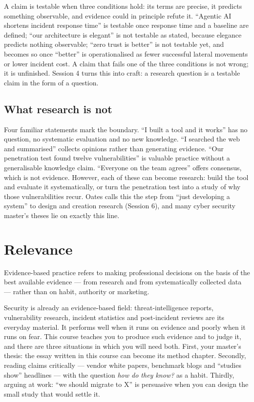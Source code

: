 \documentclass[11pt,a4paper,british,twoside=false,headings=small,chapterprefix=false,numbers=noenddot]{scrbook}
\newenvironment{block}[1]{\begin{tcolorbox}[scriptbox, title={#1}]}{\end{tcolorbox}}
\begin{document}
A claim is testable when three conditions hold: its terms are precise, it predicts something observable, and evidence could in principle refute it. ``Agentic AI shortens incident response time'' is testable once response time and a baseline are defined; ``our architecture is elegant'' is not testable as stated, because elegance predicts nothing observable; ``zero trust is better'' is not testable yet, and becomes so once ``better'' is operationalised as fewer successful lateral movements or lower incident cost. A claim that fails one of the three conditions is not wrong; it is unfinished. Session 4 turns this into craft: a research question is a testable claim in the form of a question.

\subsection{What research is not}

Four familiar statements mark the boundary. ``I built a tool and it works'' has no question, no systematic evaluation and no new knowledge. ``I searched the web and summarised'' collects opinions rather than generating evidence. ``Our penetration test found twelve vulnerabilities'' is valuable practice without a generalisable knowledge claim. ``Everyone on the team agrees'' offers consensus, which is not evidence. However, each of these can become research: build the tool and evaluate it systematically, or turn the penetration test into a study of why those vulnerabilities recur. Oates calls this the step from ``just developing a system'' to design and creation research (Session 6), and many cyber security master's theses lie on exactly this line.

\section{Relevance}

\begin{block}{Evidence-based practice}
Evidence-based practice refers to making professional decisions on the basis of the best available evidence --- from research and from systematically collected data --- rather than on habit, authority or marketing.
\end{block}

Security is already an evidence-based field: threat-intelligence reports, vulnerability research, incident statistics and post-incident reviews are its everyday material. It performs well when it runs on evidence and poorly when it runs on fear. This course teaches you to produce such evidence and to judge it, and there are three situations in which you will need both. First, your master's thesis: the essay written in this course can become its method chapter. Secondly, reading claims critically --- vendor white papers, benchmark blogs and ``studies show'' headlines --- with the question \emph{how do they know?} as a habit. Thirdly, arguing at work: ``we should migrate to X'' is persuasive when you can design the small study that would settle it.
\end{document}
